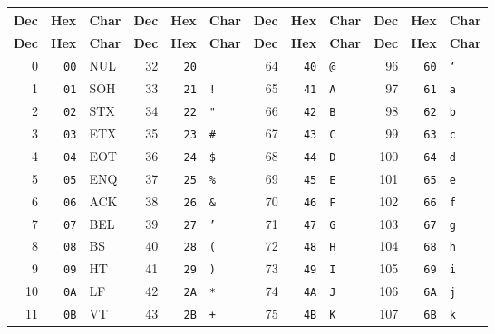 \begin{center}
\small
\setlength{\tabcolsep}{3pt}
\begin{longtable}{@{}rrl@{\qquad}rrl@{\qquad}rrl@{\qquad}rrl@{}}
\toprule
\textbf{Dec} & \textbf{Hex} & \textbf{Char} &
\textbf{Dec} & \textbf{Hex} & \textbf{Char} &
\textbf{Dec} & \textbf{Hex} & \textbf{Char} &
\textbf{Dec} & \textbf{Hex} & \textbf{Char} \\
\midrule
\endfirsthead
\toprule
\textbf{Dec} & \textbf{Hex} & \textbf{Char} &
\textbf{Dec} & \textbf{Hex} & \textbf{Char} &
\textbf{Dec} & \textbf{Hex} & \textbf{Char} &
\textbf{Dec} & \textbf{Hex} & \textbf{Char} \\
\midrule
\endhead
 0 & \texttt{00} & NUL &  32 & \texttt{20} & \textvisiblespace &  64 & \texttt{40} & \texttt{@} &  96 & \texttt{60} & \texttt{`} \\
 1 & \texttt{01} & SOH &  33 & \texttt{21} & \texttt{!} &  65 & \texttt{41} & \texttt{A} &  97 & \texttt{61} & \texttt{a} \\
 2 & \texttt{02} & STX &  34 & \texttt{22} & \texttt{"} &  66 & \texttt{42} & \texttt{B} &  98 & \texttt{62} & \texttt{b} \\
 3 & \texttt{03} & ETX &  35 & \texttt{23} & \texttt{\#} &  67 & \texttt{43} & \texttt{C} &  99 & \texttt{63} & \texttt{c} \\
 4 & \texttt{04} & EOT &  36 & \texttt{24} & \texttt{\$} &  68 & \texttt{44} & \texttt{D} & 100 & \texttt{64} & \texttt{d} \\
 5 & \texttt{05} & ENQ &  37 & \texttt{25} & \texttt{\%} &  69 & \texttt{45} & \texttt{E} & 101 & \texttt{65} & \texttt{e} \\
 6 & \texttt{06} & ACK &  38 & \texttt{26} & \texttt{\&} &  70 & \texttt{46} & \texttt{F} & 102 & \texttt{66} & \texttt{f} \\
 7 & \texttt{07} & BEL &  39 & \texttt{27} & \texttt{'} &  71 & \texttt{47} & \texttt{G} & 103 & \texttt{67} & \texttt{g} \\
 8 & \texttt{08} & BS  &  40 & \texttt{28} & \texttt{(} &  72 & \texttt{48} & \texttt{H} & 104 & \texttt{68} & \texttt{h} \\
 9 & \texttt{09} & HT  &  41 & \texttt{29} & \texttt{)} &  73 & \texttt{49} & \texttt{I} & 105 & \texttt{69} & \texttt{i} \\
10 & \texttt{0A} & LF  &  42 & \texttt{2A} & \texttt{*} &  74 & \texttt{4A} & \texttt{J} & 106 & \texttt{6A} & \texttt{j} \\
11 & \texttt{0B} & VT  &  43 & \texttt{2B} & \texttt{+} &  75 & \texttt{4B} & \texttt{K} & 107 & \texttt{6B} & \texttt{k} \\

\end{longtable}
\end{center}
